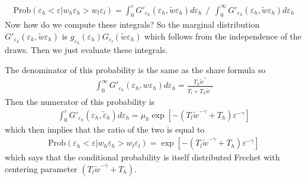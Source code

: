 \documentclass[pdftex,12pt]{article}
\begin{document}
\begin{align}
\displaystyle
\mathrm{Prob}\left( \varepsilon_h < \varepsilon | w_h \varepsilon_h >  w_l\varepsilon_l\right) = \int_0^{\varepsilon}G'_{\varepsilon_h}(\varepsilon_h,\tilde w\varepsilon_h)d\varepsilon_h \ \ \bigg/ \ \ \int_0^{\infty}G'_{\varepsilon_h}(\varepsilon_h,\tilde w\varepsilon_h)d\varepsilon_h
\end{align}
Now how do we compute these integrals? So the marginal distribution $G'_{\varepsilon_h}(\varepsilon_h, \tilde w\varepsilon_h)$ is $g_{\varepsilon_h}(\varepsilon_h)G_{\varepsilon_l}(\tilde w\varepsilon_h)$ which follows from the independence of the draws. Then we just evaluate these integrals.

\medskip
\noindent The denominator of this probability is the same as the share formula so
\begin{align}
\int_0^{\infty}G'_{\varepsilon_h}(\varepsilon_h,w\varepsilon_h)d\varepsilon_h = \frac{T_h \tilde w ^{\gamma}}{T_l + T_h \tilde w ^{\gamma}}
\end{align}
Then the numerator of this probability is
\begin{align}
\int_0^{\varepsilon}G'_{\varepsilon_h}(\varepsilon_h,\tilde \varepsilon_h)d\varepsilon_h = \mu_h \exp\left[-\left(T_l\tilde w ^{-\gamma} + T_h \right)\varepsilon^{-\gamma}\right]
\end{align}
which then implies that the ratio of the two is equal to
\begin{align}
\mathrm{Prob}\left( \varepsilon_h < \varepsilon | w_h \varepsilon_h >  w_l\varepsilon_l\right) = \exp\left[-\left(T_l\tilde w ^{-\gamma} + T_h \right)\varepsilon^{-\gamma}\right]
\end{align}
which says that the conditional probability is itself distributed Frechet with centering parameter $\left(T_l\tilde w ^{-\gamma} + T_h \right)$.
\end{document}
